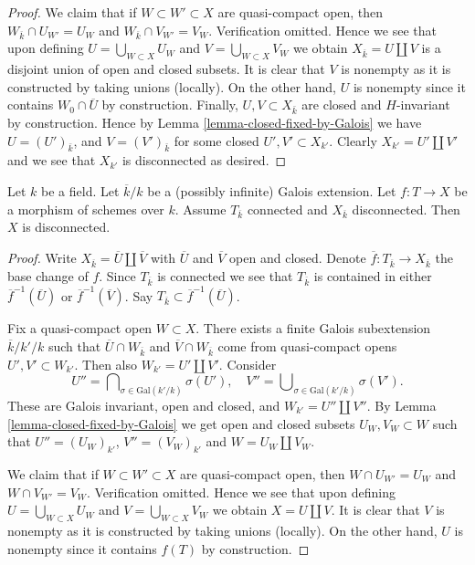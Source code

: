 \begin{proof}
\medskip\noindent
We claim that if $W \subset W' \subset X$ are quasi-compact
open, then $W_{\overline{k}} \cap U_{W'} = U_W$ and
$W_{\overline{k}} \cap V_{W'} = V_W$. Verification omitted.
Hence we see that upon defining $U = \bigcup_{W \subset X} U_W$
and $V = \bigcup_{W \subset X} V_W$ we obtain
$X_{\overline{k}} = U \amalg V$ is a disjoint union of open
and closed subsets.
It is clear that $V$ is nonempty as it is constructed by taking
unions (locally). On the other hand, $U$ is nonempty since it contains
$W_0 \cap \overline{U}$ by construction. Finally, $U, V \subset X_{\bar k}$
are closed and $H$-invariant by construction. Hence by
Lemma \ref{lemma-closed-fixed-by-Galois}
we have $U = (U')_{\bar k}$, and $V = (V')_{\bar k}$ for some
closed $U', V' \subset X_{k'}$. Clearly $X_{k'} = U' \amalg V'$
and we see that $X_{k'}$ is disconnected as desired.
\end{proof}

\begin{lemma}
\label{lemma-tricky}
Let $k$ be a field. Let $\overline{k}/k$ be a (possibly infinite)
Galois extension. Let $f : T \to X$ be a morphism of schemes over $k$.
Assume $T_{\overline{k}}$ connected and $X_{\overline{k}}$
disconnected. Then $X$ is disconnected.
\end{lemma}

\begin{proof}
Write $X_{\overline{k}} = \overline{U} \amalg \overline{V}$
with $\overline{U}$ and $\overline{V}$ open and closed.
Denote $\overline{f} : T_{\overline{k}} \to X_{\overline{k}}$ the base
change of $f$. Since $T_{\overline{k}}$ is connected we see that
$T_{\overline{k}}$ is contained in either $\overline{f}^{-1}(\overline{U})$
or $\overline{f}^{-1}(\overline{V})$.
Say $T_{\overline{k}} \subset \overline{f}^{-1}(\overline{U})$.

\medskip\noindent
Fix a quasi-compact open $W \subset X$. There exists a
finite Galois subextension $\overline{k}/k'/k$
such that $\overline{U} \cap W_{\overline{k}}$ and
$\overline{V} \cap W_{\overline{k}}$ come from quasi-compact
opens $U', V' \subset W_{k'}$. Then also $W_{k'} = U' \amalg V'$.
Consider
$$
U'' = \bigcap\nolimits_{\sigma \in \text{Gal}(k'/k)} \sigma(U'),
\quad
V'' = \bigcup\nolimits_{\sigma \in \text{Gal}(k'/k)} \sigma(V').
$$
These are Galois invariant, open and closed, and
$W_{k'} = U'' \amalg V''$.
By Lemma \ref{lemma-closed-fixed-by-Galois} we get open and closed subsets
$U_W, V_W \subset W$ such that
$U'' = (U_W)_{k'}$, $V'' = (V_W)_{k'}$ and
$W = U_W \amalg V_W$.

\medskip\noindent
We claim that if $W \subset W' \subset X$ are quasi-compact
open, then $W \cap U_{W'} = U_W$ and $W \cap V_{W'} = V_W$.
Verification omitted.
Hence we see that upon defining $U = \bigcup_{W \subset X} U_W$
and $V = \bigcup_{W \subset X} V_W$ we obtain $X = U \amalg V$.
It is clear that $V$ is nonempty as it is constructed by taking
unions (locally). On the other hand, $U$ is nonempty since it contains
$f(T)$ by construction.
\end{proof}

